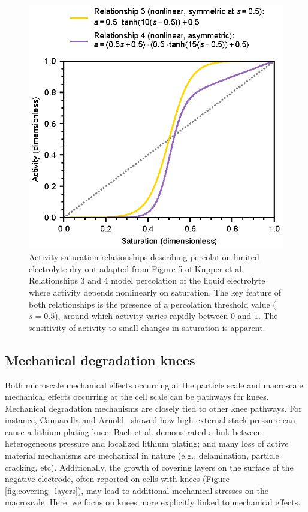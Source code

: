 \documentclass[journal=jpclcd,manuscript=article]{achemso}
\begin{document}
\begin{figure}[ht]
    \centering
    \includegraphics[scale=1.0]{figures/percolation.eps}
    \caption{Activity-saturation relationships describing percolation-limited electrolyte dry-out adapted from Figure 5 of Kupper et al.\cite{kupper_end--life_2018} Relationships 3 and 4 model percolation of the liquid electrolyte where activity depends nonlinearly on saturation. The key feature of both relationships is the presence of a percolation threshold value ($s=0.5$), around which activity varies rapidly between $0$ and $1$.
    The sensitivity of activity to small changes in saturation is apparent.}
    \label{fig:percolation}
\end{figure}

\subsection{Mechanical degradation knees}

Both microscale mechanical effects occurring at the particle scale and macroscale mechanical effects occurring at the cell scale can be pathways for knees.
Mechanical degradation mechanisms are closely tied to other knee pathways. For instance, Cannarella and Arnold~\cite{cannarella_stress_2014} showed how high external stack pressure can cause a lithium plating knee; Bach et al.\cite{bach_nonlinear_2016} demonstrated a link between heterogeneous pressure and localized lithium plating; and many loss of active material mechanisms are mechanical in nature (e.g., delamination, particle cracking, etc).
Additionally, the growth of covering layers on the surface of the negative electrode, often reported on cells with knees (Figure \ref{fig:covering_layers}), \cite{lewerenz_post-mortem_2017,willenberg_development_2020,stiaszny_electrochemical_2014} may lead to additional mechanical stresses on the macroscale.
Here, we focus on knees more explicitly linked to mechanical effects.
\end{document}
